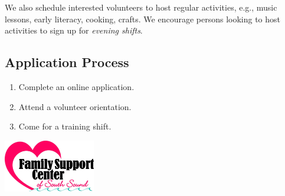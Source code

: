 \documentclass[14pt]{extarticle}
\begin{document}
We also schedule interested volunteers to host regular activities, e.g., music lessons, early literacy, cooking, crafts. We encourage persons looking to host activities to sign up for \emph{evening shifts}.

\subsection*{Application Process}

\begin{enumerate}[itemsep=0pt]
	\item Complete an online application.
    \item Attend a volunteer orientation.
    \item Come for a training shift.
\end{enumerate}

\vspace{-100pt}
\small
\begin{flushright}
\includegraphics[width = 0.3\textwidth]{logo.png}
\end{flushright}
\end{document}
